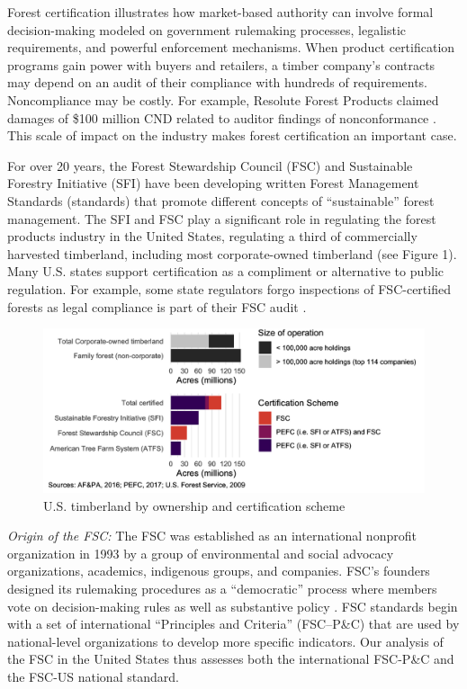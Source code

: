 \documentclass[
      12pt,
            Review ]{article}
\begin{document}
Forest certification illustrates how market-based authority can involve formal decision-making modeled on government rulemaking processes, legalistic requirements, and powerful enforcement mechanisms. When product certification programs gain power with buyers and retailers, a timber company's contracts may depend on an audit of their compliance with hundreds of requirements. Noncompliance may be costly. For example, Resolute Forest Products claimed damages of \$100 million CND related to auditor findings of nonconformance \citep{Tigar2017}. This scale of impact on the industry makes forest certification an important case.

For over 20 years, the Forest Stewardship Council (FSC) and Sustainable Forestry Initiative (SFI) have been developing written Forest Management Standards (standards) that promote different concepts of ``sustainable'' forest management. The SFI and FSC play a significant role in regulating the forest products industry in the United States, regulating a third of commercially harvested timberland, including most corporate-owned timberland (see Figure 1). Many U.S. states support certification as a compliment or alternative to public regulation. For example, some state regulators forgo inspections of FSC-certified forests as legal compliance is part of their FSC audit \citep{Judge-Lord2013}.

\begin{figure}
\centering
\includegraphics{../Figs/acres-1.png}
\caption{U.S. timberland by ownership and certification scheme}
\end{figure}

\emph{Origin of the FSC:} The FSC was established as an international nonprofit organization in 1993 by a group of environmental and social advocacy organizations, academics, indigenous groups, and companies. FSC's founders designed its rulemaking procedures as a ``democratic'' process where members vote on decision-making rules as well as substantive policy \citep{Meidinger2003}. FSC standards begin with a set of international ``Principles and Criteria'' (FSC--P\&C) that are used by national-level organizations to develop more specific indicators. Our analysis of the FSC in the United States thus assesses both the international FSC-P\&C and the FSC-US national standard.
\end{document}
